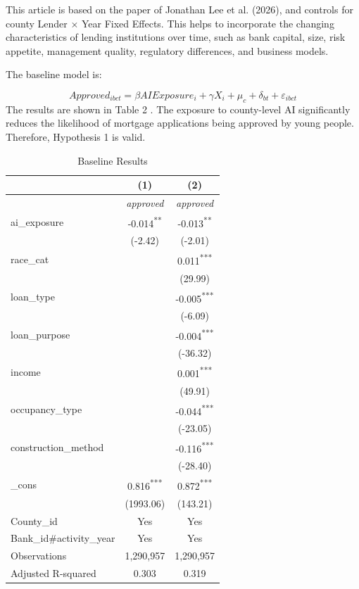 \documentclass[11pt,a4paper]{article}
\begin{document}
This article is based on the paper of Jonathan Lee et al. (2026), and controls for county Lender $\times$ Year Fixed Effects. This helps to incorporate the changing characteristics of lending institutions over time, such as bank capital, size, risk appetite, management quality, regulatory differences, and business models.

The baseline model is:


\begin{equation}\label{eq:baseline}
Approved_{ibct} = \beta AIExposure_{i} + \gamma X_{i} + \mu_{c} + \delta_{bt} + \varepsilon_{ibct}
\end{equation}
The results are shown in Table 2 . The exposure to county-level AI significantly reduces the likelihood of mortgage applications being approved by young people. Therefore, Hypothesis 1 is valid.

\begin{table}[H]
\centering
\caption{Baseline Results}
\label{tab:baseline}
\small
\renewcommand{\arraystretch}{1.06}
\begin{tabular}{@{}lcc@{}}
\toprule
 & \textbf{(1)} & \textbf{(2)} \\
\midrule
 & \textit{approved} & \textit{approved} \\
\midrule
ai\_exposure & -0.014\textsuperscript{**} & -0.013\textsuperscript{**} \\
 & (-2.42) & (-2.01) \\
race\_cat &  & 0.011\textsuperscript{***} \\
 &  & (29.99) \\
loan\_type &  & -0.005\textsuperscript{***} \\
 &  & (-6.09) \\
loan\_purpose &  & -0.004\textsuperscript{***} \\
 &  & (-36.32) \\
income &  & 0.001\textsuperscript{***} \\
 &  & (49.91) \\
occupancy\_type &  & -0.044\textsuperscript{***} \\
 &  & (-23.05) \\
construction\_method &  & -0.116\textsuperscript{***} \\
 &  & (-28.40) \\
\_cons & 0.816\textsuperscript{***} & 0.872\textsuperscript{***} \\
 & (1993.06) & (143.21) \\
County\_id & Yes & Yes \\
\addlinespace[2pt]
Bank\_id\#activity\_year & Yes & Yes \\
Observations & 1,290,957 & 1,290,957 \\
Adjusted R-squared & 0.303 & 0.319 \\
\bottomrule
\end{tabular}
\end{table}
\end{document}
